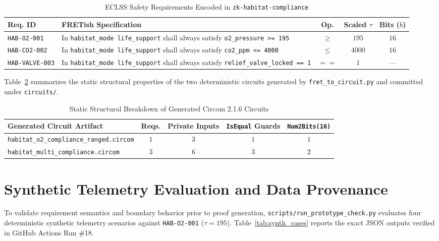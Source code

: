 \documentclass[runningheads]{llncs}
\begin{document}
\begin{table}[t]
\centering
\caption{ECLSS Safety Requirements Encoded in \texttt{zk-habitat-compliance}}
\label{tab:reqs}
\scriptsize
\begin{tabular}{l p{5.3cm} c c c}
\toprule
\textbf{Req. ID} & \textbf{FRETish Specification} & \textbf{Op.} & \textbf{Scaled $\tau$} & \textbf{Bits ($b$)} \\
\midrule
\texttt{HAB-O2-001} & In \texttt{habitat\_mode life\_support} shall always satisfy \texttt{o2\_pressure >= 195} & $\ge$ & $195$ & $16$ \\
\texttt{HAB-CO2-002} & In \texttt{habitat\_mode life\_support} shall always satisfy \texttt{co2\_ppm <= 4000} & $\le$ & $4000$ & $16$ \\
\texttt{HAB-VALVE-003} & In \texttt{habitat\_mode life\_support} shall always satisfy \texttt{relief\_valve\_locked == 1} & $==$ & $1$ & --- \\
\bottomrule
\end{tabular}
\end{table}

Table~\ref{tab:circuit_metrics} summarizes the static structural properties of the two deterministic circuits generated by \texttt{fret\_to\_circuit.py} and committed under \texttt{circuits/}.

\begin{table}[t]
\centering
\caption{Static Structural Breakdown of Generated Circom 2.1.6 Circuits}
\label{tab:circuit_metrics}
\scriptsize
\begin{tabular}{l c c c c}
\toprule
\textbf{Generated Circuit Artifact} & \textbf{Reqs.} & \textbf{Private Inputs} & \textbf{\texttt{IsEqual} Guards} & \textbf{\texttt{Num2Bits(16)}} \\
\midrule
\texttt{habitat\_o2\_compliance\_ranged.circom} & $1$ & $3$ & $1$ & $1$ \\
\texttt{habitat\_multi\_compliance.circom} & $3$ & $6$ & $3$ & $2$ \\
\bottomrule
\end{tabular}
\end{table}

\section{Synthetic Telemetry Evaluation and Data Provenance}
To validate requirement semantics and boundary behavior prior to proof generation, \texttt{scripts/run\_prototype\_check.py} evaluates four deterministic synthetic telemetry scenarios against \texttt{HAB-O2-001} ($\tau = 195$). Table~\ref{tab:synth_cases} reports the exact JSON outputs verified in GitHub Actions Run \#18.
\end{document}
